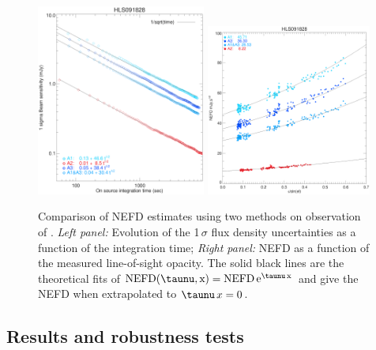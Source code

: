 \begin{figure}[!thbp]
  \begin{center}
    \includegraphics[trim={0.5cm, 0.5cm, 1.5cm, 1.8cm}, clip, angle=0, width=0.495\textwidth]{Figures/hls_nefd_vst.eps}
    \includegraphics[trim={0.5cm, 0, 0.2cm, 0.5cm}, clip, angle=0, width=0.485\textwidth]{Figures/hls_NEFD_vs_TauElev_all.eps}
    \caption{Comparison of NEFD estimates using two methods on
      observation of \hls. \emph{Left panel:} Evolution of the
    1\,$\sigma$ flux density uncertainties as a function of the
    integration time; \emph{Right panel:} NEFD as a function of the
    measured line-of-sight opacity. The solid black lines are the
    theoretical fits of
    $\rm{NEFD}(\taunu, x) = \rm{NEFD}\, e^{\taunu\,x}$
    and give the NEFD when extrapolated
    to $\taunu\,x = 0$. }
    \label{fig:nefd_twomethods}
  \end{center}
\end{figure}

\subsection{Results and robustness tests}
\label{se:nefd_results}

